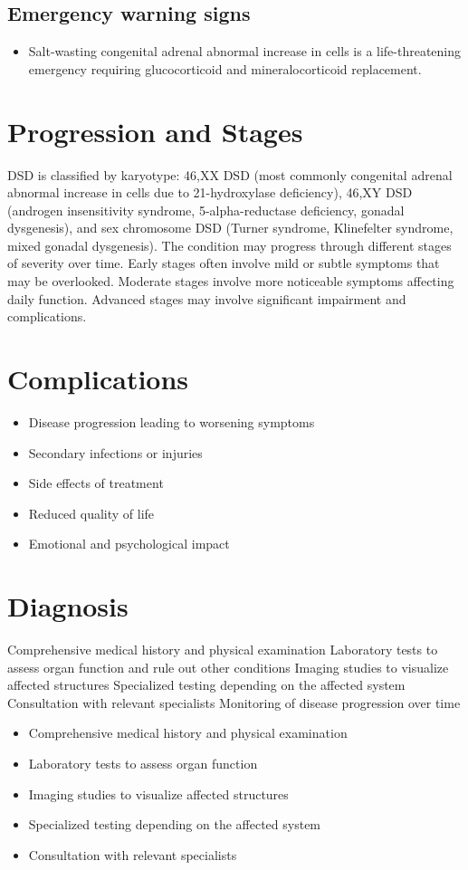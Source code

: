 \subsection{Emergency warning signs}
\begin{itemize}[noitemsep]
  \item Salt-wasting congenital adrenal abnormal increase in cells is a life-threatening emergency requiring glucocorticoid and mineralocorticoid replacement.
\end{itemize}
\section{Progression and Stages}
DSD is classified by karyotype: 46,XX DSD (most commonly congenital adrenal abnormal increase in cells due to 21-hydroxylase deficiency), 46,XY DSD (androgen insensitivity syndrome, 5-alpha-reductase deficiency, gonadal dysgenesis), and sex chromosome DSD (Turner syndrome, Klinefelter syndrome, mixed gonadal dysgenesis). The condition may progress through different stages of severity over time. Early stages often involve mild or subtle symptoms that may be overlooked. Moderate stages involve more noticeable symptoms affecting daily function. Advanced stages may involve significant impairment and complications.
\section{Complications}
\begin{itemize}[noitemsep]
  \item Disease progression leading to worsening symptoms
  \item Secondary infections or injuries
  \item Side effects of treatment
  \item Reduced quality of life
  \item Emotional and psychological impact
\end{itemize}
\section{Diagnosis}
Comprehensive medical history and physical examination Laboratory tests to assess organ function and rule out other conditions Imaging studies to visualize affected structures Specialized testing depending on the affected system Consultation with relevant specialists Monitoring of disease progression over time

\begin{itemize}[noitemsep]
  \item Comprehensive medical history and physical examination
  \item Laboratory tests to assess organ function
  \item Imaging studies to visualize affected structures
  \item Specialized testing depending on the affected system
  \item Consultation with relevant specialists
\end{itemize}
